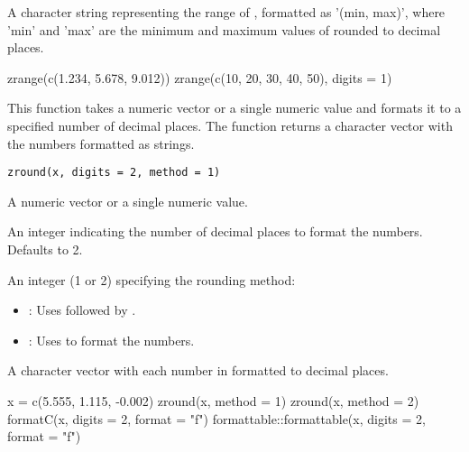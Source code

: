\documentclass[a4paper]{book}
\begin{document}
%
\begin{Value}
A character string representing the range of , formatted as
'(min, max)', where 'min' and 'max' are the minimum and maximum values of 
rounded to  decimal places.
\end{Value}
%
\begin{Examples}
\begin{ExampleCode}
zrange(c(1.234, 5.678, 9.012))
zrange(c(10, 20, 30, 40, 50), digits = 1)

\end{ExampleCode}
\end{Examples}
%
\begin{Description}
This function takes a numeric vector or a single numeric value and
formats it to a specified number of decimal places. The function
returns a character vector with the numbers formatted as strings.
\end{Description}
%
\begin{Usage}
\begin{verbatim}
zround(x, digits = 2, method = 1)
\end{verbatim}
\end{Usage}
%
\begin{Arguments}
\begin{ldescription}
\item[\code{x}] A numeric vector or a single numeric value.

\item[\code{digits}] An integer indicating the number of decimal places
to format the numbers. Defaults to 2.

\item[\code{method}] An integer (1 or 2) specifying the rounding method:
\begin{itemize}

\item{} : Uses  followed by .
\item{} : Uses  to format the numbers.

\end{itemize}

\end{ldescription}
\end{Arguments}
%
\begin{Value}
A character vector with each number in  formatted to
 decimal places.
\end{Value}
%
\begin{Examples}
\begin{ExampleCode}
x = c(5.555, 1.115, -0.002)
zround(x, method = 1)
zround(x, method = 2)
formatC(x, digits = 2, format = "f")
formattable::formattable(x, digits = 2, format = "f")

\end{ExampleCode}
\end{Examples}
\printindex{}
\end{document}
